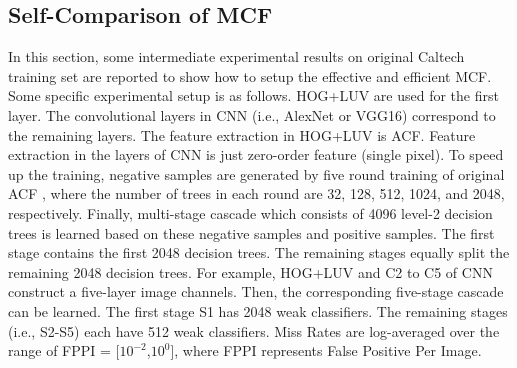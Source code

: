 \documentclass[journal]{IEEEtran}
\begin{document}
\subsection{Self-Comparison of MCF}
In this section, some intermediate experimental results on original Caltech training set are reported to show how to setup the effective and efficient MCF. Some specific experimental setup is as follows. HOG+LUV are used for the first layer. The convolutional layers in CNN (i.e., AlexNet or VGG16) correspond to the remaining layers. The feature extraction in HOG+LUV is ACF. Feature extraction in the layers of CNN is just zero-order feature (single pixel). To speed up the training, negative samples are generated by five round training of original ACF \cite{Dollar_ACF_PAMI_2014}, where the number of trees in each round are 32, 128, 512, 1024, and 2048, respectively. Finally, multi-stage cascade which consists of 4096 level-2 decision trees is learned based on these negative samples and positive samples. The first stage contains the first 2048 decision trees. The remaining stages equally split the remaining 2048 decision trees. For example, HOG+LUV and C2 to C5 of CNN construct a five-layer image channels. Then, the corresponding five-stage cascade can be learned. The first stage S1 has 2048 weak classifiers. The remaining stages (i.e., S2-S5) each have 512 weak classifiers. Miss Rates are log-averaged over the range of FPPI = [$10^{-2}$,$10^{0}$], where FPPI represents False Positive Per Image. 
\end{document}
